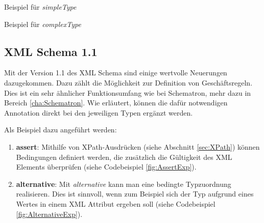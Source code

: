 \begin{program}
\centering
{}
    
\caption{Beispiel für \emph{simpleType}}
\label{fig:simpleTypeExp}
\end{program}

\begin{program}
\centering
{}
    
\caption{Beispiel für \emph{complexType}  
}
\label{fig:complexTypeExp}
\end{program}

\subsection{XML Schema 1.1}
\label{section:Schema1_1}
Mit der Version 1.1 des XML Schema sind einige wertvolle Neuerungen dazugekommen. Dazu zählt die Möglichkeit zur Definition von Geschäftsregeln. Dies ist ein sehr ähnlicher Funktionsumfang wie bei Schematron, mehr dazu in Bereich \ref{cha:Schematron}.
Wie \textcite{Walmsley} erläutert, können die dafür notwendigen Annotation direkt bei den jeweiligen Typen ergänzt werden.

Als Beispiel dazu angeführt werden:
\begin{enumerate}
\item \textbf{assert}: Mithilfe von XPath-Ausdrücken (siehe Abschnitt \ref{sec:XPath}) können Bedingungen definiert werden, die zusätzlich die Gültigkeit des XML Elements überprüfen (siehe Codebeispiel \ref{fig:AssertExp}).
\item \textbf{alternative}: Mit \emph{alternative} kann man eine bedingte Typzuordnung realisieren. Dies ist sinnvoll, wenn zum Beispiel sich der Typ aufgrund eines Wertes in einem XML Attribut ergeben soll (siehe Codebeispiel \ref{fig:AlternativeExp}).
\end{enumerate}

